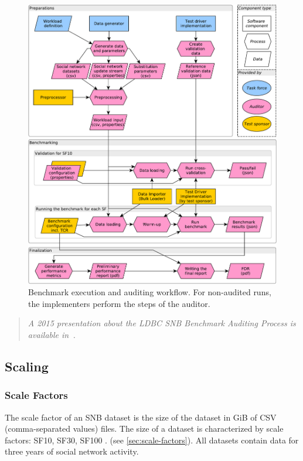 \begin{figure}[h]
    \centering
    \includegraphics[scale=\yedscale]{figures/auditing-workflow}    
    \caption{Benchmark execution and auditing workflow. For non-audited runs, the implementers perform the steps of the auditor.}
    \label{fig:audit-workflow}
\end{figure}

\begin{quote}
    \emph{A 2015 presentation about the LDBC SNB Benchmark Auditing Process is available in~\cite{auditing}.}
\end{quote}

\subsection{Scaling}

\subsubsection{Scale Factors}

The scale factor of an SNB dataset is the size of the dataset in GiB of CSV (comma-separated values) files.
The size of a dataset is characterized by scale factors: SF10, SF30, SF100 \etc. (see \autoref{sec:scale-factors}).
All datasets contain data for three years of social network activity.

